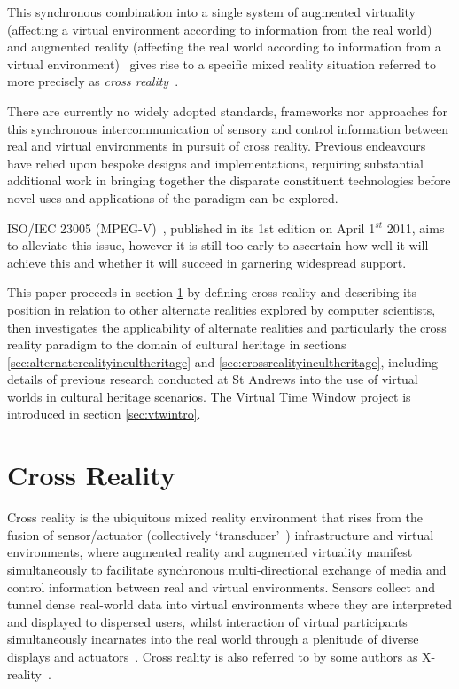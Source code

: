 \documentclass{sig-alternate}
\begin{document}
This synchronous combination into a single system of augmented virtuality (affecting a virtual environment according to information from the real world)~\cite{Want2009} and augmented reality (affecting the real world according to information from a virtual environment)~\cite{Want2009} gives rise to a specific mixed reality situation referred to more precisely as \textit{cross reality}~\cite{Coleman2009}.

There are currently no widely adopted standards, frameworks nor approaches for this synchronous intercommunication of sensory and control information between real and virtual environments in pursuit of cross reality. Previous endeavours~\cite{Lifton2007a, mit:doppel, Coleman2009, UgoTrade2007, wright:duality, Yankelovich2009, IBM2008, Marketwire2008} have relied upon bespoke designs and implementations, requiring substantial additional work in bringing together the disparate constituent technologies before novel uses and applications of the paradigm can be explored.

ISO/IEC 23005 (MPEG-V)~\cite{InternationalOrganizationforStandardization2011}, published in its 1st edition on April 1$^{st}$ 2011, aims to alleviate this issue, however it is still too early to ascertain how well it will achieve this and whether it will succeed in garnering widespread support.

This paper proceeds in section \ref{sec:crossreality} by defining cross reality and describing its position in relation to other alternate realities explored by computer scientists, then investigates the applicability of alternate realities and particularly the cross reality paradigm to the domain of cultural heritage in sections \ref{sec:alternaterealityincultheritage} and \ref{sec:crossrealityincultheritage}, including details of previous research conducted at St Andrews into the use of virtual worlds in cultural heritage scenarios. The Virtual Time Window project is introduced in section \ref{sec:vtwintro}.

\section{Cross Reality}
\label{sec:crossreality}
Cross reality is the ubiquitous mixed reality environment that rises from the fusion of sensor/actuator (collectively `transducer'~\cite{Song2008}) infrastructure and virtual environments, where augmented reality and augmented virtuality manifest simultaneously to facilitate synchronous multi-directional exchange of media and control information between real and virtual environments. Sensors collect and tunnel dense real-world data into virtual environments where they are interpreted and displayed to dispersed users, whilst interaction of virtual participants simultaneously incarnates into the real world through a plenitude of diverse displays and actuators~\cite{Paradiso2009, Coleman2009}. Cross reality is also referred to by some authors as X-reality~\cite{kim:practical}.
\end{document}
